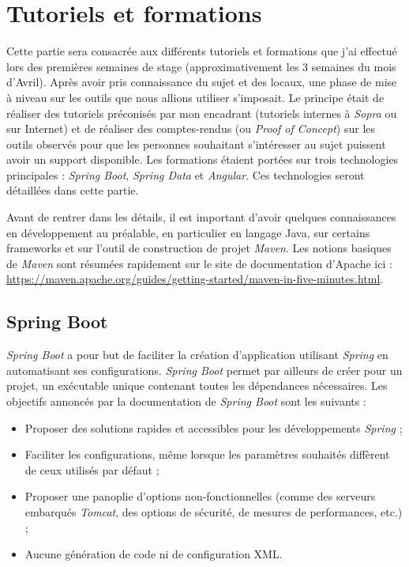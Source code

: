 \documentclass{polytech/polytech}
\begin{document}
\part{Tutoriels et formations}

Cette partie sera consacrée aux différents tutoriels et formations que j'ai effectué lors des premières semaines de stage (approximativement les 3 semaines du mois d'Avril). Après avoir pris connaissance du sujet et des locaux, une phase de mise à niveau sur les outils que nous allions utiliser s'imposait. Le principe était de réaliser des tutoriels préconisés par mon encadrant (tutoriels internes à \textit{Sopra} ou sur Internet) et de réaliser des comptes-rendus (ou \textit{Proof of Concept}) sur les outils observés pour que les personnes souhaitant s'intéresser au sujet puissent avoir un support disponible. Les formations étaient portées sur trois technologies principales : \textit{Spring Boot}, \textit{Spring Data} et \textit{Angular}. Ces technologies seront détaillées dans cette partie.

Avant de rentrer dans les détails, il est important d'avoir quelques connaissances en développement au préalable, en particulier en langage Java, sur certains frameworks et sur l'outil de construction de projet \textit{Maven}. Les notions basiques de \textit{Maven} sont résumées rapidement sur le site de documentation d'Apache ici : \url{https://maven.apache.org/guides/getting-started/maven-in-five-minutes.html}.


\chapter{Spring Boot}


\textit{Spring Boot} a pour but de faciliter la création d'application utilisant \textit{Spring} en automatisant ses configurations. \textit{Spring Boot} permet par ailleurs de créer pour un projet, un exécutable unique contenant toutes les dépendances nécessaires. Les objectifs annoncés par la documentation de \textit{Spring Boot} sont les suivants : 

\begin{itemize}
	\item Proposer des solutions rapides et accessibles pour les développements \textit{Spring} ;
	\item Faciliter les configurations, même lorsque les paramètres souhaités diffèrent de ceux utilisés par défaut ;
	\item Proposer une panoplie d'options non-fonctionnelles (comme des serveurs embarqués \textit{Tomcat}, des options de sécurité, de mesures de performances, etc.) ;
	\item Aucune génération de code ni de configuration XML. 
\end{itemize}
\end{document}
